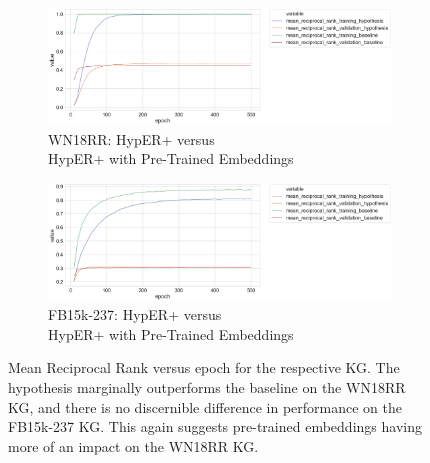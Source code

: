 \begin{figure}[H]
	\begin{subfigure}[b]{.5\linewidth}
   		\centering
    		\includegraphics[width=1.0\linewidth, height=0.6\linewidth]{WN18RR_mean_reciprocal_rank_Results_ptwv}
		\captionsetup{justification=centering}
		\caption{WN18RR: HypER+ versus \\ HypER+ with Pre-Trained Embeddings}
	\end{subfigure}
	\begin{subfigure}[b]{.5\linewidth}
   		\centering
		\includegraphics[width=1.0\linewidth, height=0.6\linewidth]{FB15k-237_mean_reciprocal_rank_Results_ptwv}
		\captionsetup{justification=centering}
		\caption{FB15k-237: HypER+ versus \\ HypER+ with Pre-Trained Embeddings}
	\end{subfigure}
	\caption{Mean Reciprocal Rank versus epoch for the respective KG. The hypothesis marginally outperforms the baseline on the WN18RR KG, and there is no discernible difference in performance on the FB15k-237 KG. This again suggests pre-trained embeddings having more of an impact on the WN18RR KG.}
\end{figure}



